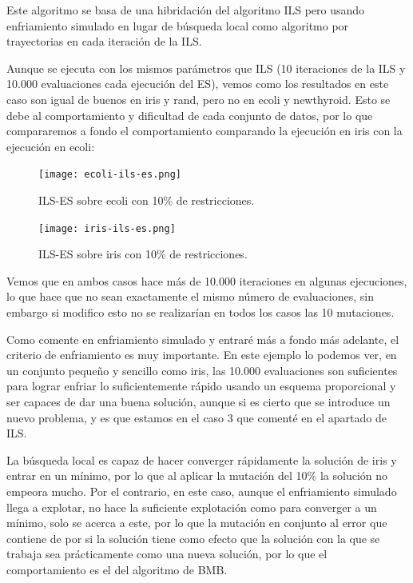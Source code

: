 \documentclass[12pt, spanish]{article}
\begin{document}
Este algoritmo se basa de una hibridación del algoritmo ILS pero usando enfriamiento simulado en lugar de búsqueda local como algoritmo por trayectorias en cada iteración de la ILS. 

Aunque se ejecuta con los mismos parámetros que ILS (10 iteraciones de la ILS y 10.000 evaluaciones cada ejecución del ES), vemos como los resultados en este caso son igual de buenos en iris y rand, pero no en ecoli y newthyroid. Esto se debe al comportamiento y dificultad de cada conjunto de datos, por lo que compararemos a fondo el comportamiento comparando la ejecución en iris con la ejecución en ecoli:


\begin{figure}[H]
	\centering
	\texttt{[image: ecoli-ils-es.png]}
	
	\caption{ILS-ES sobre ecoli con 10\% de restricciones.}
	\label{fig:ils-es-cmp2}
\end{figure}

\begin{figure}[H]
	\centering
	\texttt{[image: iris-ils-es.png]}
	
	\caption{ILS-ES sobre iris con 10\% de restricciones.}
	\label{fig:ils-es-cmp1}
\end{figure}

Vemos que en ambos casos hace más de 10.000 iteraciones en algunas ejecuciones, lo que hace que no sean exactamente el mismo número de evaluaciones, sin embargo si modifico esto no se realizarían en todos los casos las 10 mutaciones.

Como comente en enfriamiento simulado y entraré más a fondo más adelante, el criterio de enfriamiento es muy importante. En este ejemplo lo podemos ver, en un conjunto pequeño y sencillo como iris, las 10.000 evaluaciones son suficientes para lograr enfriar lo suficientemente rápido usando un esquema proporcional y ser capaces de dar una buena solución, aunque si es cierto que se introduce un nuevo problema, y es que estamos en el caso 3 que comenté en  el apartado de ILS. 

La búsqueda local es capaz de hacer converger rápidamente la solución de iris y entrar en un mínimo, por lo que al aplicar la mutación del 10\% la solución no empeora mucho. Por el contrario, en este caso, aunque el enfriamiento simulado llega a explotar, no hace la suficiente explotación como para converger a un mínimo, solo se acerca a este, por lo que la mutación en conjunto al error que contiene de por si la solución tiene como efecto que la solución con la que se trabaja sea prácticamente como una nueva solución, por lo que el comportamiento es el del algoritmo de BMB. 
\end{document}

